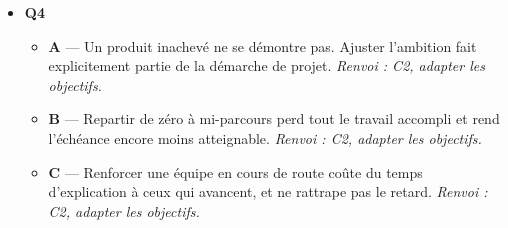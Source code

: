 \begin{itemize}
  \item \textbf{Q4}
  \begin{itemize}
    \item \textbf{A} — Un produit inachevé ne se démontre pas. Ajuster l'ambition fait explicitement partie de la démarche de projet. \emph{Renvoi : C2, adapter les objectifs.}
    \item \textbf{B} — Repartir de zéro à mi-parcours perd tout le travail accompli et rend l'échéance encore moins atteignable. \emph{Renvoi : C2, adapter les objectifs.}
    \item \textbf{C} — Renforcer une équipe en cours de route coûte du temps d'explication à ceux qui avancent, et ne rattrape pas le retard. \emph{Renvoi : C2, adapter les objectifs.}
  \end{itemize}
\end{itemize}
\fi
